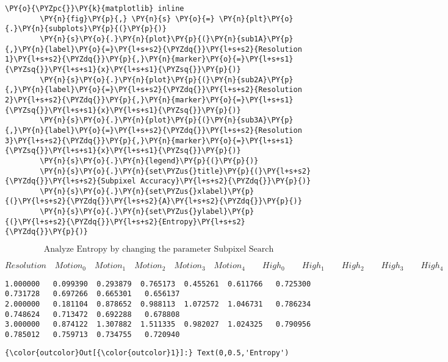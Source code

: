 {\begin{enumerate}
\begin{Verbatim}[commandchars=\\\{\}]
        \PY{o}{\PYZpc{}}\PY{k}{matplotlib} inline
        \PY{n}{fig}\PY{p}{,} \PY{n}{s} \PY{o}{=} \PY{n}{plt}\PY{o}{.}\PY{n}{subplots}\PY{p}{(}\PY{p}{)}
        \PY{n}{s}\PY{o}{.}\PY{n}{plot}\PY{p}{(}\PY{n}{sub1A}\PY{p}{,}\PY{n}{label}\PY{o}{=}\PY{l+s+s2}{\PYZdq{}}\PY{l+s+s2}{Resolution 1}\PY{l+s+s2}{\PYZdq{}}\PY{p}{,}\PY{n}{marker}\PY{o}{=}\PY{l+s+s1}{\PYZsq{}}\PY{l+s+s1}{x}\PY{l+s+s1}{\PYZsq{}}\PY{p}{)}
        \PY{n}{s}\PY{o}{.}\PY{n}{plot}\PY{p}{(}\PY{n}{sub2A}\PY{p}{,}\PY{n}{label}\PY{o}{=}\PY{l+s+s2}{\PYZdq{}}\PY{l+s+s2}{Resolution 2}\PY{l+s+s2}{\PYZdq{}}\PY{p}{,}\PY{n}{marker}\PY{o}{=}\PY{l+s+s1}{\PYZsq{}}\PY{l+s+s1}{x}\PY{l+s+s1}{\PYZsq{}}\PY{p}{)}
        \PY{n}{s}\PY{o}{.}\PY{n}{plot}\PY{p}{(}\PY{n}{sub3A}\PY{p}{,}\PY{n}{label}\PY{o}{=}\PY{l+s+s2}{\PYZdq{}}\PY{l+s+s2}{Resolution 3}\PY{l+s+s2}{\PYZdq{}}\PY{p}{,}\PY{n}{marker}\PY{o}{=}\PY{l+s+s1}{\PYZsq{}}\PY{l+s+s1}{x}\PY{l+s+s1}{\PYZsq{}}\PY{p}{)}
        \PY{n}{s}\PY{o}{.}\PY{n}{legend}\PY{p}{(}\PY{p}{)}
        \PY{n}{s}\PY{o}{.}\PY{n}{set\PYZus{}title}\PY{p}{(}\PY{l+s+s2}{\PYZdq{}}\PY{l+s+s2}{Subpixel Accuracy}\PY{l+s+s2}{\PYZdq{}}\PY{p}{)}   
        \PY{n}{s}\PY{o}{.}\PY{n}{set\PYZus{}xlabel}\PY{p}{(}\PY{l+s+s2}{\PYZdq{}}\PY{l+s+s2}{A}\PY{l+s+s2}{\PYZdq{}}\PY{p}{)}   
        \PY{n}{s}\PY{o}{.}\PY{n}{set\PYZus{}ylabel}\PY{p}{(}\PY{l+s+s2}{\PYZdq{}}\PY{l+s+s2}{Entropy}\PY{l+s+s2}{\PYZdq{}}\PY{p}{)}  
\end{Verbatim}


    $$\text{Analyze Entropy by changing the parameter Subpixel Search}$$

    
    $$Resolution\quad Motion_0\quad Motion_1\quad Motion_2\quad Motion_3\quad Motion_4\quad\quad  High_0\quad\quad High_1\quad\quad High_2\quad\quad High_3\quad\quad High_4$$

    
    \begin{Verbatim}[commandchars=\\\{\}]
1.000000   0.099390  0.293879  0.765173  0.455261  0.611766   0.725300  0.731728   0.697266  0.665301   0.656137
2.000000   0.181104  0.878652  0.988113  1.072572  1.046731   0.786234  0.748624   0.713472  0.692288   0.678808
3.000000   0.874122  1.307882  1.511335  0.982027  1.024325   0.790956  0.785012   0.759713  0.734755   0.720940

    \end{Verbatim}

\begin{Verbatim}[commandchars=\\\{\}]
{\color{outcolor}Out[{\color{outcolor}1}]:} Text(0,0.5,'Entropy')
\end{Verbatim}
            

\end{enumerate}}
